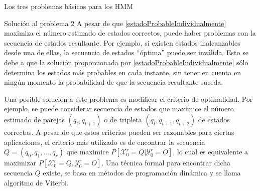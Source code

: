 \begin{section}{Los tres problemas básicos para los HMM}
\begin{subsection}{Solución al problema 2}
A pesar de que \ref{estadoProbableIndividualmente} maximiza el número estimado de estados correctos, puede haber problemas con la secuencia de estados resultante. Por ejemplo, si existen estados inalcanzables desde una de ellas, la secuencia de estados \enquote{óptima} puede ser inválida. Esto se debe a que la solución proporcionada por \ref{estadoProbableIndividualmente} sólo determina los estados más probables en cada instante, sin tener en cuenta en ningún momento la probabilidad de que la secuencia resultante suceda. 

Una posible solución a este problema es modificar el criterio de optimalidad. Por ejemplo, se puede considerar secuencia de estados que maximice el número estimado de parejas $(q_t,q_{t+1})$ o de tripleta $(q_t,q_{t+1},q_{t+2})$ de estados correctas. A pesar de que estos criterios pueden ser razonables para ciertas aplicaciones, el criterio más utilizado es de encontrar la secuencia $Q=(q_0, q_1, \dots, q_r)$ que maximice $P[\mathcal{X}_0^r=Q|\mathcal{Y}_0^r=O]$, lo cual es equivalente a maximizar $P[\mathcal{X}_0^r=Q,\mathcal{Y}_0^r=O]$. Una técnica formal para encontrar dicha secuencia $Q$ existe, se basa en métodos de programación dinámica y se llama algoritmo de Viterbi.




\end{subsection}

\end{section}